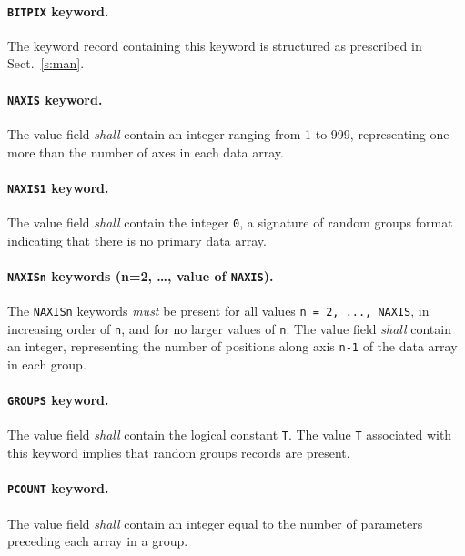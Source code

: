 \documentclass[onecolumn]{aa}
\begin{document}
   \paragraph{{\tt BITPIX} keyword.}
   The keyword record containing this keyword is structured as 
   prescribed in
   Sect.\ \ref{s:man}.
  
   \paragraph{{\tt NAXIS} keyword.}
   The value field {\em shall} contain an integer ranging from 1 to
   999, representing one more than the number of axes in each
   data array.
  
   \paragraph{{\tt NAXIS1} keyword.}
   The value field {\em shall} contain the integer {\tt 0}, a signature of
   random groups format indicating that there is 
   no primary data array.
  
   \paragraph{{\tt NAXISn} keywords (n=2, \ldots, value of {\tt NAXIS}).}
   The {\tt NAXISn} keywords {\em must} be present 
   for all values {\tt n = 2, ..., NAXIS}, in increasing order of {\tt n}, and for 
   no larger values of {\tt n}.
   The value field {\em shall} contain an integer, representing 
   the number of positions along axis {\tt n-1} of the 
   data array in each group.  
  
   \paragraph{{\tt GROUPS} keyword.}
   The value field {\em shall} contain the logical constant {\tt T}. 
   The
   value {\tt T} associated with this keyword implies that random groups 
   records are present.
  
   \paragraph{{\tt PCOUNT} keyword.}
   The value field {\em shall} contain an integer equal to the
   number
   of parameters preceding each array in a group.
  
\end{document}

